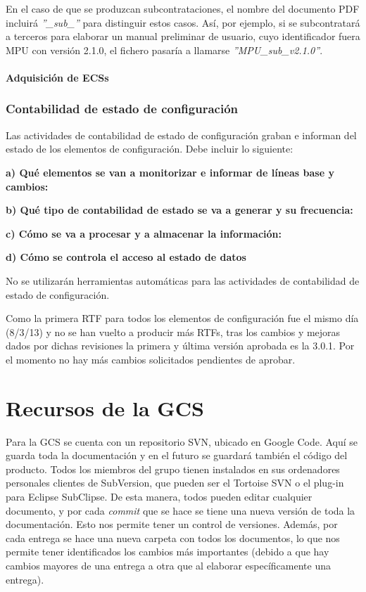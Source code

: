 \documentclass[spanish,a4paper,11pt, twoside]{report}	%
\begin{document}
		En el caso de que se produzcan subcontrataciones, el nombre del documento PDF incluirá \textit{''\_sub\_''} para distinguir estos casos. Así, por ejemplo, si se subcontratará a terceros para elaborar un manual preliminar de usuario, cuyo identificador fuera MPU con versión 2.1.0, el fichero pasaría a llamarse \textit{''MPU\_sub\_v2.1.0''}.

		\subsection{Adquisición de ECSs}


	\section{Contabilidad de estado de configuración}

	Las actividades de contabilidad de estado de configuración graban e informan del estado de los elementos de configuración. Debe incluir lo siguiente:

	\textbf{a) Qué elementos se van a monitorizar e informar de líneas base y cambios:}
	

	\textbf{b) Qué tipo de contabilidad de estado se va a generar y su frecuencia:}
	

	\textbf{c) Cómo se va a procesar y a almacenar la información:}
	

	\textbf{d) Cómo se controla el acceso al estado de datos}
	

	\vspace{0.3cm}
	No se utilizarán herramientas automáticas para las actividades de contabilidad de estado de configuración.

	Como la primera RTF para todos los elementos de configuración fue el mismo día (8/3/13) y no se han vuelto a producir más RTFs, tras los cambios y mejoras dados por dichas revisiones la primera y última versión aprobada es la 3.0.1. Por el momento no hay más cambios solicitados pendientes de aprobar.


\setcounter{section}{0}

\part{Recursos de la GCS}
			Para la GCS se cuenta con un repositorio SVN, ubicado en Google Code. Aquí se guarda toda la documentación y en el futuro se guardará también el código del producto.
			Todos los miembros del grupo tienen instalados en sus ordenadores personales clientes de SubVersion, que pueden ser el Tortoise SVN o el plug-in para Eclipse
			SubClipse. De esta manera, todos pueden editar cualquier documento, y por cada \textit{commit} que se hace se tiene una nueva versión de toda la documentación.
			Esto nos permite tener un control de versiones. Además, por cada entrega se hace una nueva carpeta con todos los documentos, lo que nos permite tener
			identificados los cambios más importantes (debido a que hay cambios mayores de una entrega a otra que al elaborar específicamente una entrega).
\newpage
\mbox{}
\thispagestyle{empty}						%
\newpage
\end{document}
